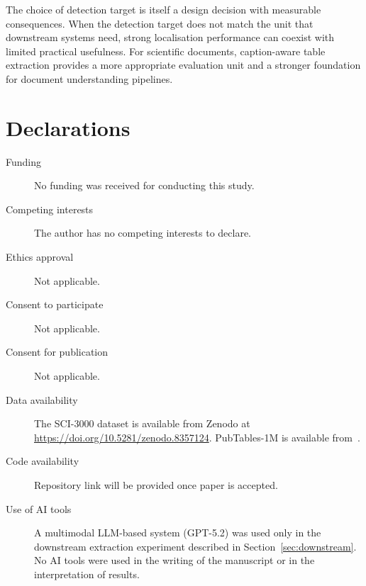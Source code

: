 \documentclass[pdflatex,sn-mathphys-num,iicol]{sn-jnl}
\begin{document}
The choice of detection target is itself a design decision with measurable
consequences. When the detection target does not match the unit that downstream
systems need, strong localisation performance can coexist with limited practical
usefulness. For scientific documents, caption-aware table extraction provides a more
appropriate evaluation unit and a stronger foundation for document understanding
pipelines.

\backmatter

\section*{Declarations}

\begin{description}
\item[Funding] No funding was received for conducting this study.
\item[Competing interests] The author has no competing interests to declare.
\item[Ethics approval] Not applicable.
\item[Consent to participate] Not applicable.
\item[Consent for publication] Not applicable.
\item[Data availability] The SCI-3000 dataset is available from Zenodo at \url{https://doi.org/10.5281/zenodo.8357124}. PubTables-1M is available from~\cite{smock2022pubtables}.
\item[Code availability] Repository link will be provided once paper is accepted.

\item[Use of AI tools] A multimodal LLM-based system (GPT-5.2) was used only in the downstream extraction experiment described in Section~\ref{sec:downstream}. No AI tools were used in the writing of the manuscript or in the interpretation of results.
\end{description}
\end{document}
